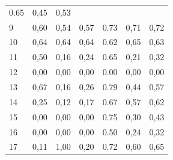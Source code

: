 \begin{table}[ht]
\begin{tabular}{l|c|c|c|c|c|c}
        0.65  & 0,45                                    & 0,53                                                      \\
        9     & 0,60                                    & 0,54                                        & 0,57      &
        0.73  & 0,71                                    & 0,72                                                      \\
        10    & 0,64                                    & 0,64                                        & 0,64      &
        0.62  & 0,65                                    & 0,63                                                      \\
        11    & 0,50                                    & 0,16                                        & 0,24      &
        0.65  & 0,21                                    & 0,32                                                      \\
        12    & 0,00                                    & 0,00                                        & 0,00      &
        0.00  & 0,00                                    & 0,00                                                      \\
        13    & 0,67                                    & 0,16                                        & 0,26      &
        0.79  & 0,44                                    & 0,57                                                      \\
        14    & 0,25                                    & 0,12                                        & 0,17      &
        0.67  & 0,57                                    & 0,62                                                      \\
        15    & 0,00                                    & 0,00                                        & 0,00      &
        0.75  & 0,30                                    & 0,43                                                      \\
        16    & 0,00                                    & 0,00                                        & 0,00      &
        0.50  & 0,24                                    & 0,32                                                      \\
        17    & 0,11                                    & 1,00                                        & 0,20      &
        0.72  & 0,60                                    & 0,65                                                      \\

\end{tabular}
\end{table}
